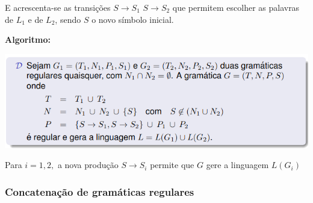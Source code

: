 \documentclass{article}
\begin{document}
\begin{flushleft}
  E acrescenta-se as transições $S \rightarrow S_1$ $S \rightarrow S_2$ que permitem
  escolher as palavras de $L_1$ e de $L_2$, sendo $S$ o novo símbolo inicial.   

  \item \textbf{Algoritmo:}

  \begin{center}
    \includegraphics[scale=0.4]{7}
  \end{center}

  \item Para $i = 1,2,$ a nova produção $S \rightarrow S_i$ permite que $G$ gere a linguagem $L(G_i)$
\end{flushleft}


\pagebreak

\subsubsection{Concatenação de gramáticas regulares}
\end{document}
